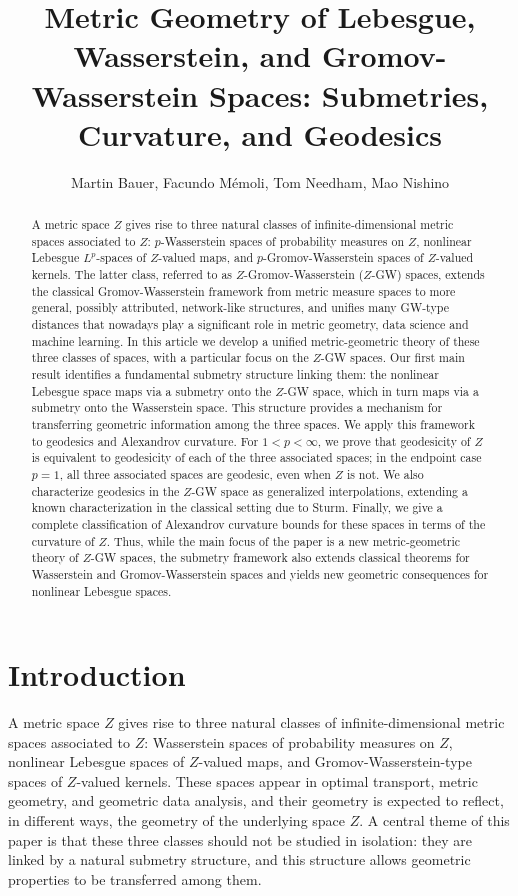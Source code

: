 \documentclass{article}
\title{Metric Geometry of Lebesgue, Wasserstein, and Gromov-Wasserstein Spaces: Submetries, Curvature, and Geodesics}
\author{Martin Bauer, Facundo M\'{e}moli, Tom Needham, Mao Nishino}
\theoremstyle{definition}
\begin{document}
\maketitle


\begin{abstract}
A metric space $Z$ gives rise to three natural classes of infinite-dimensional metric spaces associated to $Z$: $p$-Wasserstein spaces of probability measures on $Z$, nonlinear Lebesgue $L^p$-spaces of $Z$-valued maps, and $p$-Gromov-Wasserstein spaces of $Z$-valued kernels. The latter class, referred to as $Z$-Gromov-Wasserstein ($Z$-GW) spaces, extends the classical Gromov-Wasserstein framework from metric measure spaces to more general, possibly attributed, network-like structures, and unifies many GW-type distances that nowadays play a significant role in metric geometry, data science and machine learning. In this article we develop a unified metric-geometric theory of these three classes of spaces, with a particular focus on the $Z$-GW spaces. Our first main result identifies a fundamental submetry structure linking them: the nonlinear Lebesgue space maps via a submetry onto the $Z$-GW space, which in turn maps via a submetry onto the Wasserstein space. This structure provides a mechanism for transferring geometric information among the three spaces. We apply this framework to geodesics and Alexandrov curvature. For $1<p<\infty$, we prove that geodesicity of $Z$ is equivalent to geodesicity of each of the three associated spaces; in the endpoint case $p=1$, all three associated spaces are geodesic, even when $Z$ is not. We also characterize geodesics in the $Z$-GW space as generalized interpolations, extending a known characterization in the classical setting due to Sturm. Finally, we give a complete classification of Alexandrov curvature bounds for these spaces in terms of the curvature of $Z$. Thus, while the main focus of the paper is a new metric-geometric theory of $Z$-GW spaces, the submetry framework also extends classical theorems for Wasserstein and Gromov-Wasserstein spaces and yields new geometric consequences for nonlinear Lebesgue spaces.
\end{abstract}

\tableofcontents

%
%
%
%
%
%
%
%

\section{Introduction}
A metric space $Z$ gives rise to three natural classes of infinite-dimensional metric spaces associated to $Z$: Wasserstein spaces of probability measures on $Z$, nonlinear Lebesgue spaces of $Z$-valued maps, and Gromov-Wasserstein-type spaces of $Z$-valued kernels. These spaces appear in optimal transport, metric geometry, and geometric data analysis, and their geometry is expected to reflect, in different ways, the geometry of the underlying space $Z$. A central theme of this paper is that these three classes should not be studied in isolation: they are linked by a natural submetry structure, and this structure allows geometric properties to be transferred among them.
\end{document}
